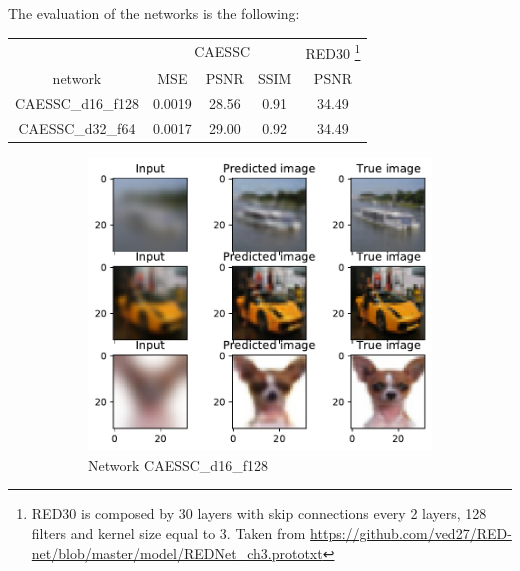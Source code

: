 The evaluation of the networks is the following:

\begin{tabularx}{300pt}{ccccc}
    & \multicolumn{3}{c}{CAESSC} & {RED30} \footnote{RED30 is composed by 30 layers with skip connections every 2 layers, 128 filters and kernel size equal to 3. Taken from \url{https://github.com/ved27/RED-net/blob/master/model/REDNet_ch3.prototxt}} \\
    network & MSE & PSNR & SSIM & PSNR  \\
    CAESSC\_d16\_f128 & 0.0019 & 28.56 & 0.91 & 34.49 \\
    CAESSC\_d32\_f64 & 0.0017 & 29.00 & 0.92 & 34.49
\end{tabularx}


\begin{figure}[H]
    \centering
    \begin{subfigure}{\textwidth}
        \centering
        \includegraphics[height=0.35\textheight,keepaspectratio]{subsections/caessc/d16_f128.pdf}
        \caption{Network CAESSC\_d16\_f128}    
    \end{subfigure}
    \begin{subfigure}{\textwidth}
        \centering

\end{subfigure}
\end{figure}

